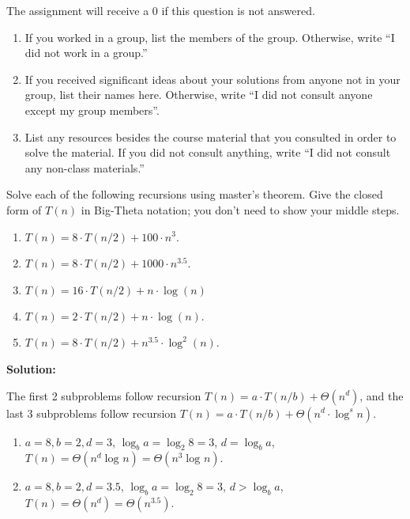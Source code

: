 \documentclass[11pt]{article}
\begin{document}
\maketitle




\begin{qunlist}

	The assignment will receive a 0 if this question is not answered.
\begin{enumerate}
	\item If you worked in a group, list the members of the group. Otherwise, write ``I did not work in a group.''
	\item If you received significant ideas about your solutions from anyone not in your group, list their names here. Otherwise, write ``I did not consult  anyone except my group members''.
	\item List any resources besides the course material that you consulted in order to solve the material. If you did not consult anything, write ``I did not consult any non-class materials.''
\end{enumerate}

Solve each of the following recursions using master's theorem.
Give the closed form of $T(n)$ in Big-Theta notation; you don't need to show your middle steps.
\begin{enumerate}
\item $ T(n) = 8 \cdot T(n/2) + 100 \cdot n^3$.
\item $ T(n) = 8 \cdot T(n/2) + 1000 \cdot n^{3.5}$.
\item $ T(n) = 16 \cdot T(n/2) + n \cdot \log(n)$
\item $ T(n) = 2 \cdot T(n/2) + n \cdot \log(n)$.
\item $ T(n) = 8 \cdot T(n/2) + n^{3.5} \cdot \log^2(n)$.
\end{enumerate}

{\bf Solution: }

The first 2 subproblems follow recursion $T(n) = a\cdot T(n/b) + \Theta(n^d)$,
	and the last 3 subproblems follow recursion $T(n) = a\cdot T(n/b) + \Theta(n^d \cdot \log ^s n)$.
	
\begin{enumerate}

\item $a = 8, b = 2, d = 3$, $ \log_ba = \log_2{8} = 3$, $d = \log_ba $, $T(n) = \Theta(n^d \log_{}n) = \Theta(n^3 \log_{}n )$.

\item $a = 8, b = 2, d = 3.5$, $ \log_ba = \log_2{8} = 3$, $d > \log_ba $, $T(n) =\Theta(n^d) = \Theta(n^{3.5})$.


\end{enumerate}
\end{qunlist}
\end{document}
